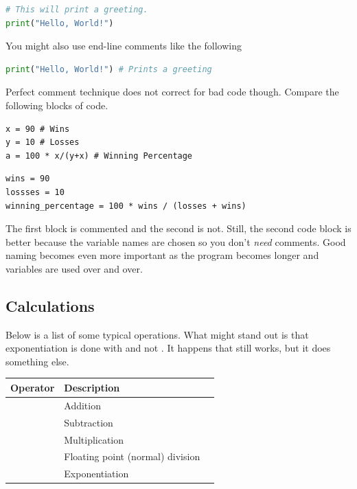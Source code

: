\documentclass{article}
\begin{document}
\begin{lstlisting}[language = Python]
# This will print a greeting.
print("Hello, World!") \end{lstlisting}

\smallskip
 \noindent You might also use end-line comments like the following

\begin{lstlisting}[language = Python]
print("Hello, World!") # Prints a greeting \end{lstlisting}

\smallskip

\noindent Perfect comment technique does not correct for bad code though. Compare the following blocks of code. 

\begin{lstlisting}
x = 90 # Wins
y = 10 # Losses
a = 100 * x/(y+x) # Winning Percentage
\end{lstlisting}

\begin{lstlisting}
wins = 90
lossses = 10
winning_percentage = 100 * wins / (losses + wins)
\end{lstlisting}

The first block is commented and the second is not. Still, the second code block is better because the variable names are chosen so you don't \emph{need} comments. Good naming becomes even more important as the program becomes longer and variables are used over and over. 



\subsection{Calculations}
Below is a list of some typical operations. What might stand out is that exponentiation is done with \code{**} and not \code{^}. It happens that \code{^} still works, but it does something else. 


\begin{center}
{\setlength{\tabcolsep}{2em}
\begin{tabular}{lll}
\toprule
Operator & Description \\
\midrule
\code{+} &    Addition \\
\code{-} & Subtraction \\
\code{*}  &    Multiplication \\
\code{/}  &   Floating point (normal) division \\
\code{**} & Exponentiation \\
\bottomrule
\end{tabular}}
\end{center}
\end{document}
